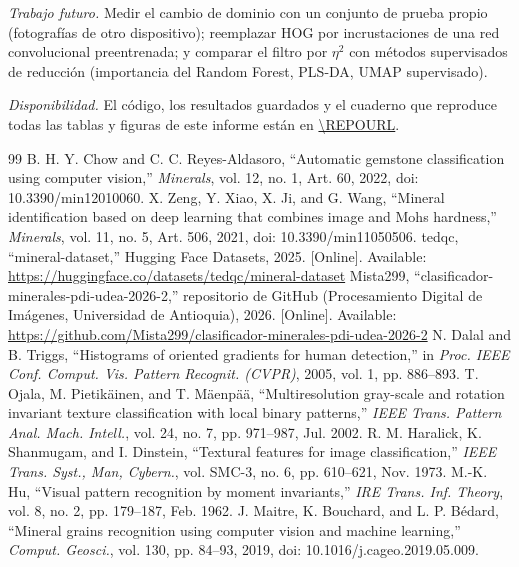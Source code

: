 \documentclass[journal]{IEEEtran}
\begin{document}
\emph{Trabajo futuro.} Medir el cambio de dominio con un conjunto de prueba propio (fotografías de otro dispositivo); reemplazar HOG por incrustaciones de una red convolucional preentrenada; y comparar el filtro por $\eta^2$ con métodos supervisados de reducción (importancia del Random Forest, PLS-DA, UMAP supervisado).

\emph{Disponibilidad.} El código, los resultados guardados y el cuaderno que reproduce todas las tablas y figuras de este informe están en \expandafter\url\expandafter{\REPOURL}.

\begin{thebibliography}{99}
 B. H. Y. Chow and C. C. Reyes-Aldasoro, ``Automatic gemstone classification using computer vision,'' \emph{Minerals}, vol. 12, no. 1, Art. 60, 2022, doi: 10.3390/min12010060.
 X. Zeng, Y. Xiao, X. Ji, and G. Wang, ``Mineral identification based on deep learning that combines image and Mohs hardness,'' \emph{Minerals}, vol. 11, no. 5, Art. 506, 2021, doi: 10.3390/min11050506.
 tedqc, ``mineral-dataset,'' Hugging Face Datasets, 2025. [Online]. Available: \url{https://huggingface.co/datasets/tedqc/mineral-dataset}
 Mista299, ``clasificador-minerales-pdi-udea-2026-2,'' repositorio de GitHub (Procesamiento Digital de Im\'agenes, Universidad de Antioquia), 2026. [Online]. Available: \url{https://github.com/Mista299/clasificador-minerales-pdi-udea-2026-2}
 N. Dalal and B. Triggs, ``Histograms of oriented gradients for human detection,'' in \emph{Proc. IEEE Conf. Comput. Vis. Pattern Recognit. (CVPR)}, 2005, vol. 1, pp. 886--893.
 T. Ojala, M. Pietik\"ainen, and T. M\"aenp\"a\"a, ``Multiresolution gray-scale and rotation invariant texture classification with local binary patterns,'' \emph{IEEE Trans. Pattern Anal. Mach. Intell.}, vol. 24, no. 7, pp. 971--987, Jul. 2002.
 R. M. Haralick, K. Shanmugam, and I. Dinstein, ``Textural features for image classification,'' \emph{IEEE Trans. Syst., Man, Cybern.}, vol. SMC-3, no. 6, pp. 610--621, Nov. 1973.
 M.-K. Hu, ``Visual pattern recognition by moment invariants,'' \emph{IRE Trans. Inf. Theory}, vol. 8, no. 2, pp. 179--187, Feb. 1962.
 J. Maitre, K. Bouchard, and L. P. Bédard, ``Mineral grains recognition using computer vision and machine learning,'' \emph{Comput. Geosci.}, vol. 130, pp. 84--93, 2019, doi: 10.1016/j.cageo.2019.05.009.

\end{thebibliography}
\end{document}
